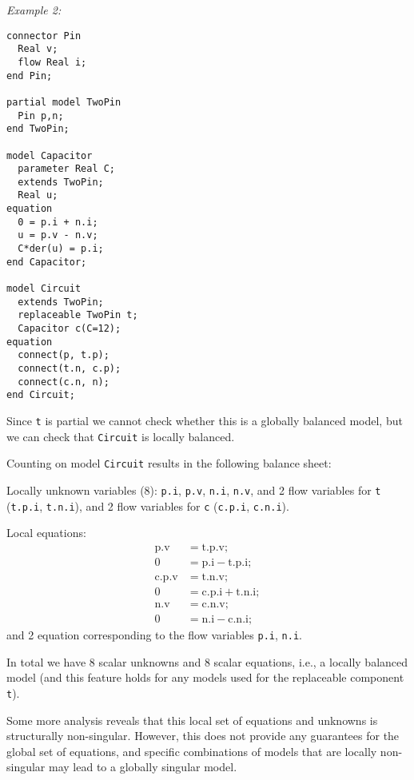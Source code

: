 \begin{example}
\emph{Example 2:}
\begin{lstlisting}[language=modelica]
connector Pin
  Real v;
  flow Real i;
end Pin;

partial model TwoPin
  Pin p,n;
end TwoPin;

model Capacitor
  parameter Real C;
  extends TwoPin;
  Real u;
equation
  0 = p.i + n.i;
  u = p.v - n.v;
  C*der(u) = p.i;
end Capacitor;

model Circuit
  extends TwoPin;
  replaceable TwoPin t;
  Capacitor c(C=12);
equation
  connect(p, t.p);
  connect(t.n, c.p);
  connect(c.n, n);
end Circuit;
\end{lstlisting}

Since \lstinline!t! is partial we cannot check whether this is a globally balanced model, but we can check that \lstinline!Circuit! is locally balanced.

Counting on model \lstinline!Circuit! results in the following balance sheet:

Locally unknown variables (8): \lstinline!p.i!, \lstinline!p.v!, \lstinline!n.i!, \lstinline!n.v!, and 2 flow variables for \lstinline!t! (\lstinline!t.p.i!, \lstinline!t.n.i!), and 2 flow variables for \lstinline!c! (\lstinline!c.p.i!, \lstinline!c.n.i!).

Local equations:
\begin{align*} \text{p.v} &= \text{t.p.v};\\
0 &= \text{p.i}-\text{t.p.i};\\
\text{c.p.v} &= \text{t.n.v};\\
0 &= \text{c.p.i}+\text{t.n.i};\\
\text{n.v} &= \text{c.n.v};\\
0 &= \text{n.i}-\text{c.n.i};
\end{align*}
and 2 equation corresponding to the flow variables \lstinline!p.i!, \lstinline!n.i!.

In total we have 8 scalar unknowns and 8 scalar equations, i.e., a locally balanced model (and this feature holds for any models used for the replaceable component \lstinline!t!).

Some more analysis reveals that this local set of equations and unknowns is structurally non-singular.
However, this does not provide any guarantees for the global set of equations, and specific combinations of models that are locally non-singular may lead to a globally singular model.
\end{example}

